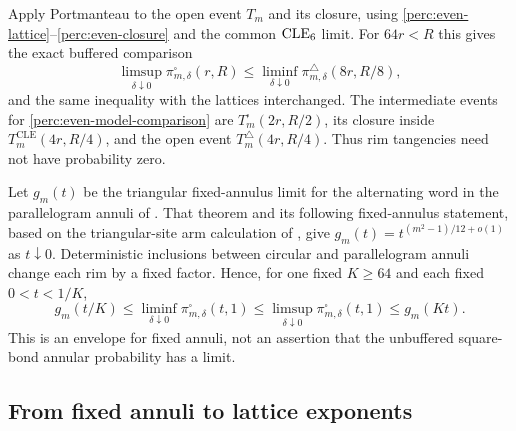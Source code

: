 Apply Portmanteau to the open event $T_m$ and its closure, using
\eqref{perc:even-lattice}--\eqref{perc:even-closure} and the common
$\operatorname{CLE}_6$ limit.  For $64r<R$ this gives the exact buffered comparison
\begin{equation}\label{perc:even-model-comparison}
 \limsup_{\delta\downarrow0}\pi^\square_{m,\delta}(r,R)
 \le
 \liminf_{\delta\downarrow0}\pi^\triangle_{m,\delta}(8r,R/8),
\end{equation}
and the same inequality with the lattices interchanged.  The
intermediate events for \eqref{perc:even-model-comparison} are
$T_m^\square(2r,R/2)$, its closure inside
$T_m^{\mathrm{CLE}}(4r,R/4)$, and the open event
$T_m^\triangle(4r,R/4)$.  Thus rim tangencies need not have
probability zero.

Let $g_m(t)$ be the triangular fixed-annulus limit for the alternating
word in the parallelogram annuli of \citet[Theorem~20]{Nolin2008NearCritical}.
That theorem and its following fixed-annulus statement, based on the
triangular-site arm calculation of \citet{SmirnovWerner2001Exponents},
give
$g_m(t)=t^{(m^2-1)/12+o(1)}$ as $t\downarrow0$.  Deterministic
inclusions between circular and parallelogram annuli change each rim
by a fixed factor.  Hence, for one fixed $K\ge64$ and each fixed
$0<t<1/K$,
\begin{equation}\label{perc:even-envelope}
 g_m(t/K)
 \le\liminf_{\delta\downarrow0}\pi^\square_{m,\delta}(t,1)
 \le\limsup_{\delta\downarrow0}\pi^\square_{m,\delta}(t,1)
 \le g_m(Kt).
\end{equation}
This is an envelope for fixed annuli, not an assertion that the
unbuffered square-bond annular probability has a limit.

\subsection{From fixed annuli to lattice exponents}

